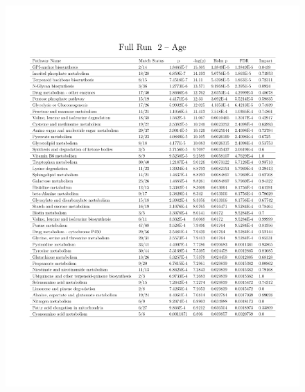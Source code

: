 \documentclass[a4paper]{book}
\begin{document}
\begin{subappendices}
\begin{figure}
	\centering
	\includegraphics[width=\linewidth]{3.Metabolomics/MSEA_charts_3.pdf}
\end{figure}


\end{subappendices}
\end{document}
